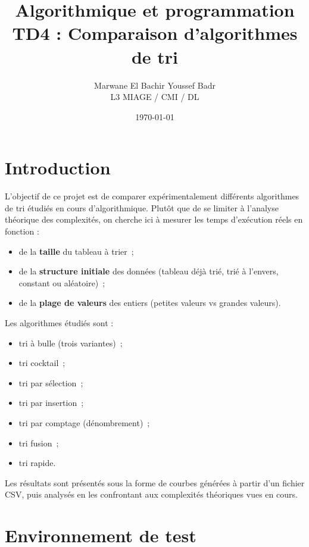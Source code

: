\documentclass[11pt,a4paper]{article}
\title{Algorithmique et programmation\\[0.5em]
TD4 : Comparaison d'algorithmes de tri}
\author{Marwane El Bachir Youssef Badr\\L3 MIAGE / CMI / DL}
\date{\today}
\begin{document}
\maketitle
\tableofcontents
\newpage

\section{Introduction}

L'objectif de ce projet est de comparer expérimentalement différents
algorithmes de tri étudiés en cours d'algorithmique.  
Plutôt que de se limiter à l'analyse théorique des complexités, on
cherche ici à mesurer les temps d'exécution réels en fonction :

\begin{itemize}
  \item de la \textbf{taille} du tableau à trier~;
  \item de la \textbf{structure initiale} des données (tableau déjà trié,
        trié à l'envers, constant ou aléatoire)~;
  \item de la \textbf{plage de valeurs} des entiers (petites valeurs
        vs grandes valeurs).
\end{itemize}

Les algorithmes étudiés sont :

\begin{itemize}
  \item tri à bulle (trois variantes)~;
  \item tri cocktail~;
  \item tri par sélection~;
  \item tri par insertion~;
  \item tri par comptage (dénombrement)~;
  \item tri fusion~;
  \item tri rapide.
\end{itemize}

Les résultats sont présentés sous la forme de courbes générées à partir
d'un fichier CSV, puis analysés en les confrontant aux complexités
théoriques vues en cours.

\section{Environnement de test}
\end{document}
